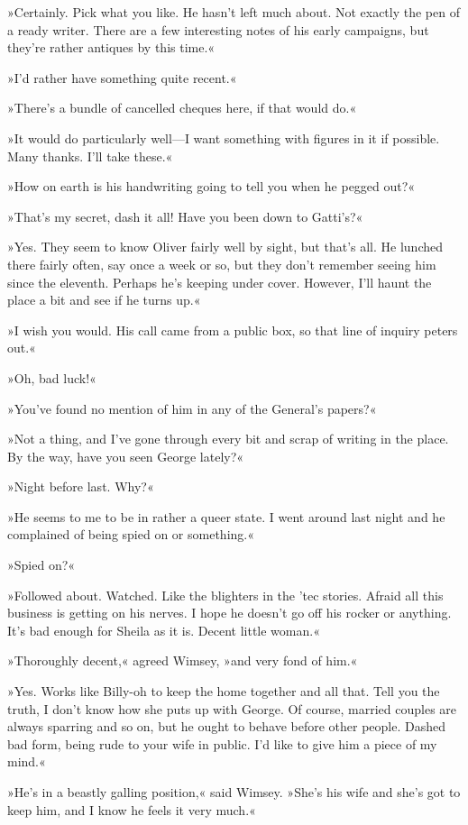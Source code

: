 »Certainly. Pick what you like. He hasn't left much about. Not exactly the pen of a ready writer. There are a few interesting notes of his early campaigns, but they're rather antiques by this time.«

»I'd rather have something quite recent.«

»There's a bundle of cancelled cheques here, if that would do.«

»It would do particularly well—I want something with figures in it if possible. Many thanks. I'll take these.«

»How on earth is his handwriting going to tell you when he pegged out?«

»That's my secret, dash it all! Have you been down to Gatti's?«

»Yes. They seem to know Oliver fairly well by sight, but that's all. He lunched there fairly often, say once a week or so, but they don't remember seeing him since the eleventh. Perhaps he's keeping under cover. However, I'll haunt the place a bit and see if he turns up.«

»I wish you would. His call came from a public box, so that line of inquiry peters out.«

»Oh, bad luck!«

»You've found no mention of him in any of the General's papers?«

»Not a thing, and I've gone through every bit and scrap of writing in the place. By the way, have you seen George lately?«

»Night before last. Why?«

»He seems to me to be in rather a queer state. I went around last night and he complained of being spied on or something.«

»Spied on?«

»Followed about. Watched. Like the blighters in the 'tec stories. Afraid all this business is getting on his nerves. I hope he doesn't go off his rocker or anything. It's bad enough for Sheila as it is. Decent little woman.«

»Thoroughly decent,« agreed Wimsey, »and very fond of him.«

»Yes. Works like Billy-oh to keep the home together and all that. Tell you the truth, I don't know how she puts up with George. Of course, married couples are always sparring and so on, but he ought to behave before other people. Dashed bad form, being rude to your wife in public. I'd like to give him a piece of my mind.«

»He's in a beastly galling position,« said Wimsey. »She's his wife and she's got to keep him, and I know he feels it very much.«

